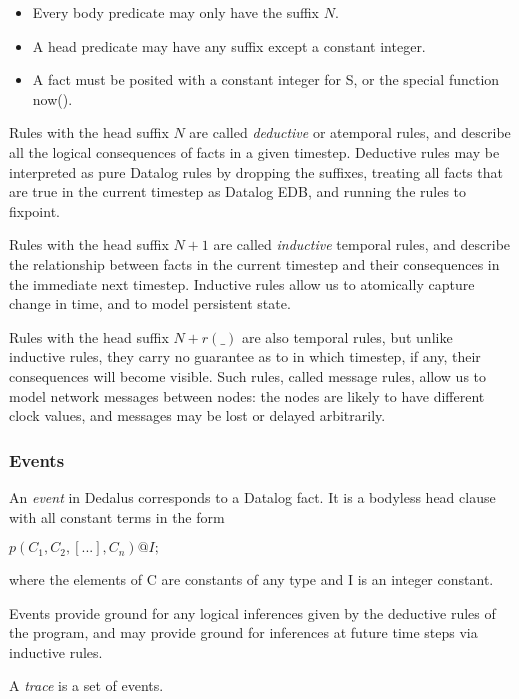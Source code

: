 \begin{itemize}
\item Every body predicate may only have the suffix $N$.
\item A head predicate may have any suffix except a constant integer.
\item A fact must be posited with a constant integer for S, or the special function now().
\end{itemize}
Rules with the head suffix $N$ are called \emph{deductive} or atemporal rules, and describe all the logical consequences of facts in a given 
timestep. Deductive rules may be interpreted as pure Datalog rules by dropping the suffixes, treating all facts that are true in the current 
timestep as Datalog EDB, and running the rules to fixpoint.

Rules with the head suffix $N + 1$ are called \emph{inductive} temporal rules, and describe the relationship between facts in the current timestep 
and their consequences in the immediate next timestep. Inductive rules allow us to atomically capture change in time, and to model persistent state.

Rules with the head suffix $N+r(\_)$ are also temporal rules, but unlike inductive rules, they carry no guarantee as to in which timestep, if any, 
their consequences will become visible. Such rules, called message rules, allow us to model network messages between nodes: the nodes 
are likely to have different clock values, and messages may be lost or delayed arbitrarily.


\subsubsection{Events}

An \emph{event} in Dedalus corresponds to a Datalog fact.  It is a bodyless head clause with all constant terms in the form


$p(C_{1},C_{2},[...],C_{n})@I;$


where the elements of C are constants of any type and I is an integer constant.

Events provide ground for any logical inferences given by the deductive rules of the program, and may provide ground for inferences at 
future time steps via inductive rules.

\begin{definition}
A \emph{trace} is a set of events.
\end{definition}


